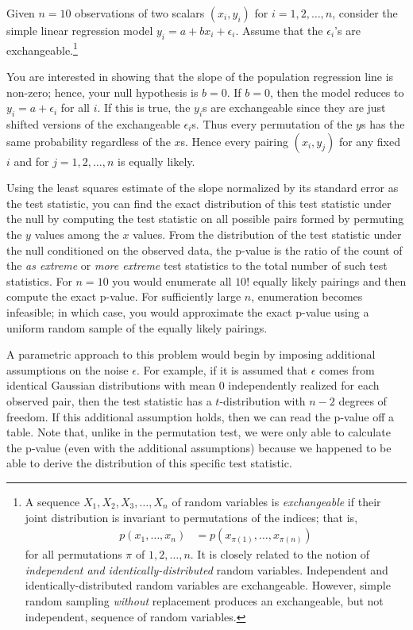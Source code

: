\begin{example} Given $n=10$ observations of two scalars $(x_i, y_i)$ for
$i = 1, 2, \dots, n$, consider the simple linear regression model
$y_i = a + bx_i + \epsilon_i$.  Assume that the $\epsilon_i$'s are
exchangeable.\footnote{A sequence $X_1, X_2, X_3, \dots, X_n$ of random
variables is \emph{exchangeable} if their joint distribution is invariant to
permutations of the indices; that is,
\begin{align*}
p(x_1, \dots, x_n) &= p(x_{\pi(1)}, \dots, x_{\pi(n)})
\end{align*}
for all permutations $\pi$ of $1, 2, \dots, n$.  It is closely related to the
notion of \emph{independent and identically-distributed} random variables.
Independent and identically-distributed random variables are exchangeable.
However, simple random sampling \emph{without} replacement produces an
exchangeable, but not independent, sequence of random variables.}

You are interested in showing that the slope of the population regression line
is non-zero; hence, your null hypothesis is $b = 0$. If $b = 0$, then the model
reduces to $y_i = a + \epsilon_i$ for all $i$.  If this is true, the
$y_i$s are exchangeable since they are just shifted versions of the
exchangeable $\epsilon_i$s.  Thus every permutation of the $y$s has the same
probability regardless of the $x$s.  Hence every pairing
$(x_i, y_j)$ for any fixed $i$ and for $j = 1, 2, \dots, n$ is equally likely.

Using the least squares estimate of the slope normalized by its standard error
as the test statistic, you can find the exact distribution of this test
statistic under the null by computing the test statistic on all possible pairs
formed by permuting the $y$ values among the $x$ values.  From the distribution
of the test statistic under the null conditioned on the observed data, the
p-value is the ratio of the count of the \emph{as extreme} or \emph{more
extreme} test statistics to the total number of such test statistics. For
$n=10$ you would enumerate all $10!$ equally likely pairings and then compute
the exact p-value.  For sufficiently large $n$, enumeration becomes infeasible;
in which case, you would approximate the exact p-value using a uniform random
sample of the equally likely pairings.

A parametric approach to this problem would begin by imposing additional
assumptions on the noise $\epsilon$.  For example, if it is assumed that
$\epsilon$ comes from identical Gaussian distributions with mean 0
independently realized for each observed pair, then the test statistic has a
$t$-distribution with $n-2$ degrees of freedom.  If this additional assumption
holds, then we can read the p-value off a table.  Note that, unlike in the
permutation test, we were only able to calculate the p-value (even with the
additional assumptions) because we happened to be able to derive the
distribution of this specific test statistic.
\end{example}

